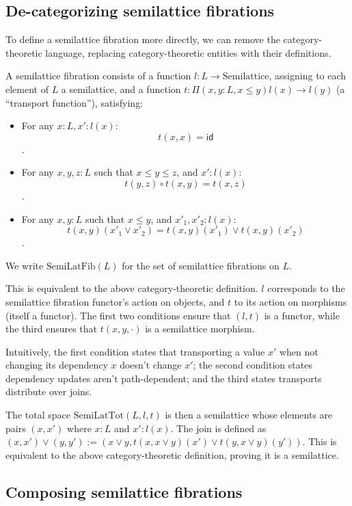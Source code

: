 \documentclass{article}
\begin{document}
    \subsection{De-categorizing semilattice fibrations}

      To define a semilattice fibration more directly, we can remove the category-theoretic language, replacing category-theoretic entities with their definitions.

      A semilattice fibration consists of a function $l : L \rightarrow \mathrm{Semilattice}$, assigning to each element of $L$ a semilattice, and a function $t : \Pi (x, y : L, x \leq y) l(x) \rightarrow l(y)$ (a ``transport function''), satisfying:

      \begin{itemize}
        \item For any $x : L, x' : l(x)$: $$t(x, x) = \mathsf{id}$$.
        \item For any $x, y, z : L$ such that $x \leq y \leq z$, and $x' : l(x)$: $$t(y, z) \circ t(x, y) = t(x, z)$$.
        \item For any $x, y : L$ such that $x \leq y$, and $x'_1, x'_2 : l(x)$: $$t(x, y)(x'_1 \vee x'_2) = t(x, y)(x'_1) \vee t(x, y)(x'_2)$$.
      \end{itemize}

      We write $\mathrm{SemiLatFib}(L)$ for the set of semilattice fibrations on $L$.

      This is equivalent to the above category-theoretic definition. $l$ corresponds to the semilattice fibration functor's action on objects, and $t$ to its action on morphisms (itself a functor). The first two conditions ensure that $(l, t)$ is a functor, while the third ensures that $t(x, y, \cdot)$ is a semilattice morphism.

      Intuitively, the first condition states that transporting a value $x'$ when not changing its dependency $x$ doesn't change $x'$; the second condition states dependency updates aren't path-dependent; and the third states transports distribute over joins.

      The total space $\mathrm{SemiLatTot}(L, l, t)$ is then a semilattice whose elements are pairs $(x, x')$ where $x : L$ and $x' : l(x)$. The join is defined as $(x, x') \vee (y, y') := (x \vee y, t(x, x \vee y)(x') \vee t(y, x \vee y)(y'))$. This is equivalent to the above category-theoretic definition, proving it is a semilattice.

    \subsection{Composing semilattice fibrations}
\end{document}
